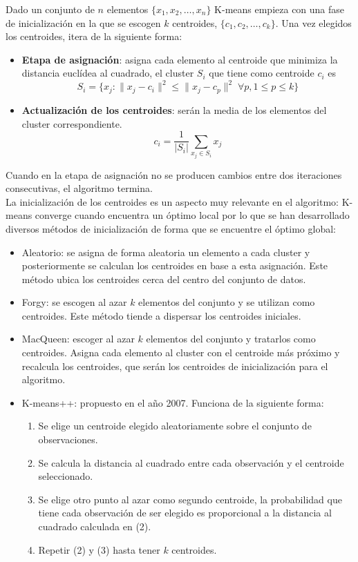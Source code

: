 Dado un conjunto de $n$ elementos $\{x_1, x_2, \dots, x_n\}$ K-means empieza con una fase de inicialización en la que se escogen $k$ centroides, $\{c_1, c_2, \dots, c_k\}$. Una vez elegidos los centroides, itera de la siguiente forma: 
\begin{itemize}
\item \textbf{Etapa de asignación}: asigna cada elemento al centroide que minimiza la distancia euclídea al cuadrado, el cluster $S_i$ que tiene como centroide $c_i$ es
\begin{equation}
S_i = \{x_j : \lVert x_j - c_i \rVert ^2 \leq \lVert x_j - c_p \rVert ^2 \; \forall p, 1\leq p \leq k\} \nonumber
\end{equation}
\item \textbf{Actualización de los centroides}: serán la media de los elementos del cluster correspondiente.
\begin{equation}
c_i = \frac{1}{\displaystyle |S_i|}\sum_{x_j \in S_i}x_j \nonumber
\end{equation}
\end{itemize}

Cuando en la etapa de asignación no se producen cambios entre dos iteraciones consecutivas, el algoritmo termina. \\

La inicialización de los centroides es un aspecto muy relevante en el algoritmo: K-means converge cuando encuentra un óptimo local por lo que se han desarrollado diversos métodos de inicialización de forma que se encuentre el óptimo global:
\begin{itemize}
\item Aleatorio: se asigna de forma aleatoria un elemento a cada cluster y posteriormente se calculan los centroides en base a esta asignación. Este método ubica los centroides cerca del centro del conjunto de datos.
\item Forgy: se escogen al azar $k$ elementos del conjunto y se utilizan como centroides. Este método tiende a dispersar los centroides iniciales.
\item MacQueen: escoger al azar $k$ elementos del conjunto y tratarlos como centroides. Asigna cada elemento al cluster con el centroide más próximo y recalcula los centroides, que serán los centroides de inicialización para el algoritmo.
\item K-means++: propuesto en el a\~no 2007. Funciona de la siguiente forma:
    \begin{enumerate}
    \item Se elige un centroide elegido aleatoriamente sobre el conjunto de observaciones.
    \item Se calcula la distancia al cuadrado entre cada observación y el centroide seleccionado.
    \item Se elige otro punto al azar como segundo centroide, la probabilidad que tiene cada observación de ser elegido es proporcional a la distancia al cuadrado calculada en (2).
    \item Repetir (2) y (3) hasta tener $k$ centroides.
    \end{enumerate}
\end{itemize}

